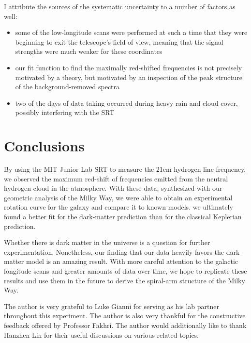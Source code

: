 \documentclass[aps,twocolumn,secnumarabic,balancelastpage,amsmath,amssymb,nofootinbib, floatfix]{revtex4-2}
\begin{document}
	I attribute the sources of the systematic uncertainty to a number of factors as well:
	\begin{itemize}
		\item some of the low-longitude scans were performed at such a time that they were beginning to exit the telescope's field of view, meaning that the signal strengths were much weaker for these coordinates
		\item our fit function to find the maximally red-shifted frequencies is not precisely motivated by a theory, but motivated by an inspection of the peak structure of the background-removed spectra
		\item two of the days of data taking occurred during heavy rain and cloud cover, possibly interfering with the SRT
	\end{itemize}  
	
	
	\section{Conclusions}
	By using the MIT Junior Lab SRT to measure the 21cm hydrogen line frequency, we observed the maximum red-shift of frequencies emitted from the neutral hydrogen cloud in the atmosphere. With these data, synthesized with our geometric analysis of the Milky Way, we were able to obtain an experimental rotation curve for the galaxy and compare it to known models. we ultimately found a better fit for the dark-matter prediction than for the classical Keplerian prediction.
	
	Whether there is dark matter in the universe is a question for further experimentation. Nonetheless, our finding that our data heavily favors the dark-matter model is an amazing result. With more careful attention to the galactic longitude scans and greater amounts of data over time, we hope to replicate these results and use them in the future to derive the spiral-arm structure of the Milky Way.
	
	
	\begin{acknowledgments} The author is very grateful to Luke Gianni for serving as his lab partner throughout this experiment. The author is also very thankful for the constructive feedback offered by Professor Fakhri. The author would additionally like to thank Hanzhen Lin for their useful discussions on various related topics. 
	\end{acknowledgments}
	
	
	
	
\end{document}
